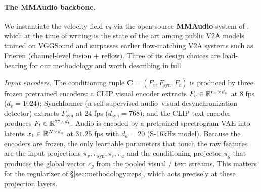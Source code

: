 \paragraph{The MMAudio backbone.}
We instantiate the velocity field $v_\theta$ via the open-source
\textbf{MMAudio} system of \citet{cheng_2025_mmaudio}, which at the
time of writing is the state of the art among public V2A models trained on
VGGSound and surpasses earlier flow-matching V2A systems such as
Frieren \citep{wang2025frierenefficientvideotoaudiogeneration} (channel-level fusion +
reflow). Three of its design choices are
load-bearing for our methodology and worth describing in full.

\emph{Input encoders.} The conditioning tuple
$\mathbf{C} = (F_v, F_{\mathrm{syn}}, F_t)$ is produced by three
frozen pretrained encoders: a CLIP visual encoder extracts
$F_v \in \mathbb{R}^{n_v \times d_v}$ at $8$ fps ($d_v = 1024$);
Synchformer (a self-supervised audio--visual desynchronization
detector) extracts $F_{\mathrm{syn}}$ at $24$ fps
($d_{\mathrm{syn}} = 768$); and the CLIP text encoder produces
$F_t \in \mathbb{R}^{77 \times d_t}$. Audio is encoded by a pretrained
spectrogram VAE into latents $x_1 \in \mathbb{R}^{N \times d_a}$ at
$31.25$ fps with $d_a = 20$ (S-16kHz model). Because the encoders
are frozen, the only learnable parameters that touch the raw
features are the input projections $\pi_v, \pi_{\mathrm{syn}},
\pi_t, \pi_a$ and the conditioning projector $\pi_g$ that produces
the global vector $c_g$ from the pooled visual / text streams.
This matters for the regularizer of \S\ref{sec:methodology:reps},
which acts precisely at these projection layers.

